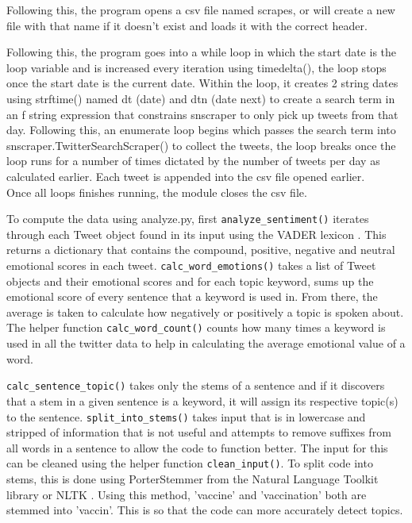 \documentclass[fontsize=11pt]{article}
\begin{document}
Following this, the program opens a csv file named scrapes, or will create a new file with that name if it doesn't exist and loads it with the correct header.

Following this, the program goes into a while loop in which the start date is the loop variable and is increased every iteration using timedelta(), the loop stops once the start date is the current date. Within the loop, it creates 2 string dates using strftime() named dt (date) and dtn (date next) to create a search term in an f string expression that constrains snscraper to only pick up tweets from that day. Following this, an enumerate loop begins which passes the search term into snscraper.TwitterSearchScraper() to collect the tweets, the loop breaks once the loop runs for a number of times dictated by the number of tweets per day as calculated earlier. Each tweet is appended into the csv file opened earlier.\\
Once all loops finishes running, the module closes the csv file.

To compute the data using analyze.py, first \verb|analyze_sentiment()| iterates through each Tweet object found in its input using the VADER lexicon \cite{vader}. This returns a dictionary that contains the compound, positive, negative and neutral emotional scores in each tweet. \verb|calc_word_emotions()| takes a list of Tweet objects and their emotional scores and for each topic keyword, sums up the emotional score of every sentence that a keyword is used in. From there, the average is taken to calculate how negatively or positively a topic is spoken about. The helper function \verb|calc_word_count()| counts how many times a keyword is used in all the twitter data to help in calculating the average emotional value of a word.

\verb|calc_sentence_topic()| takes only the stems of a sentence and if it discovers that a stem in a given sentence is a keyword, it will assign its respective topic(s) to the sentence. \verb|split_into_stems()| takes input that is in lowercase and stripped of information that is not useful and attempts to remove suffixes from all words in a sentence to allow the code to function better. The input for this can be cleaned using the helper function \verb|clean_input()|. To split code into stems, this is done using PorterStemmer from the Natural Language Toolkit library or NLTK \cite{nltk}. Using this method, 'vaccine' and 'vaccination' both are stemmed into 'vaccin'. This is so that the code can more accurately detect topics.
\end{document}
